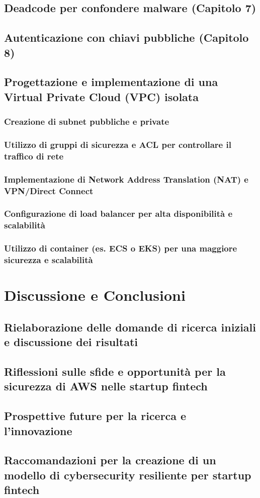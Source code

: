 \documentclass[a4paper,12pt]{report}
\begin{document}
\section{Deadcode per confondere malware (Capitolo 7)}
\section{Autenticazione con chiavi pubbliche (Capitolo 8)}
\section{Progettazione e implementazione di una Virtual Private Cloud (VPC) isolata}
\subsection{Creazione di subnet pubbliche e private}
\subsection{Utilizzo di gruppi di sicurezza e ACL per controllare il traffico di rete}
\subsection{Implementazione di Network Address Translation (NAT) e VPN/Direct Connect}
\subsection{Configurazione di load balancer per alta disponibilità e scalabilità}
\subsection{Utilizzo di container (es. ECS o EKS) per una maggiore sicurezza e scalabilità}

\chapter{Discussione e Conclusioni}
\section{Rielaborazione delle domande di ricerca iniziali e discussione dei risultati}
\section{Riflessioni sulle sfide e opportunità per la sicurezza di AWS nelle startup fintech}
\section{Prospettive future per la ricerca e l'innovazione}
\section{Raccomandazioni per la creazione di un modello di cybersecurity resiliente per startup fintech}


%
\printbibliography

% 
\end{document}
